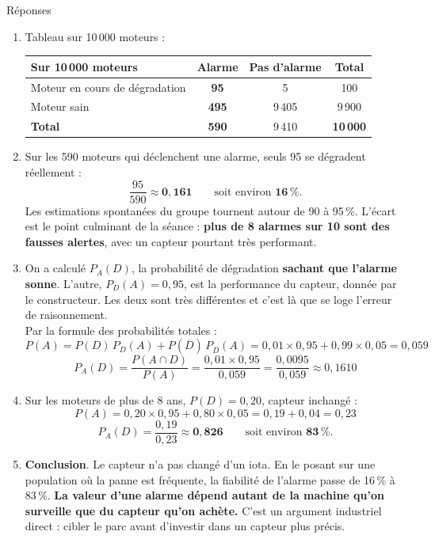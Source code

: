 \documentclass[a4paper,11pt]{article}
\begin{document}
\begin{exo}{Réponses}
\begin{enumerate}
  \item Tableau sur 10\,000 moteurs :
  \begin{center}
  \renewcommand{\arraystretch}{1.5}
  \begin{tabular}{|>{\columncolor{uimmlightblue}}l|c|c|c|}
  \hline
  \rowcolor{uimmlightblue}
  \textbf{Sur 10\,000 moteurs} & \textbf{Alarme} & \textbf{Pas d'alarme} & \textbf{Total} \\
  \hline
  Moteur en cours de dégradation & \textbf{95} & 5 & 100 \\
  \hline
  Moteur sain & \textbf{495} & 9\,405 & 9\,900 \\
  \hline
  \textbf{Total} & \textbf{590} & 9\,410 & \textbf{10\,000} \\
  \hline
  \end{tabular}
  \end{center}
  \item Sur les 590 moteurs qui déclenchent une alarme, seuls 95 se dégradent réellement :
  \[ \frac{95}{590} \approx \mathbf{0{,}161} \qquad \text{soit environ } \mathbf{16\,\%}. \]
  Les estimations spontanées du groupe tournent autour de 90 à 95\,\%. L'écart est le point culminant de la séance : \textbf{plus de 8 alarmes sur 10 sont des fausses alertes}, avec un capteur pourtant très performant.
  \item On a calculé $P_A(D)$, la probabilité de dégradation \textbf{sachant que l'alarme sonne}. L'autre, $P_D(A) = 0{,}95$, est la performance du capteur, donnée par le constructeur. Les deux sont très différentes et c'est là que se loge l'erreur de raisonnement. \\[4pt]
  Par la formule des probabilités totales :
  \[ P(A) = P(D)\,P_D(A) + P(\overline{D})\,P_{\overline{D}}(A) = 0{,}01 \times 0{,}95 + 0{,}99 \times 0{,}05 = 0{,}059 \]
  \[ P_A(D) = \frac{P(A \cap D)}{P(A)} = \frac{0{,}01 \times 0{,}95}{0{,}059} = \frac{0{,}0095}{0{,}059} \approx 0{,}1610 \]
  \item Sur les moteurs de plus de 8 ans, $P(D) = 0{,}20$, capteur inchangé :
  \[ P(A) = 0{,}20 \times 0{,}95 + 0{,}80 \times 0{,}05 = 0{,}19 + 0{,}04 = 0{,}23 \]
  \[ P_A(D) = \frac{0{,}19}{0{,}23} \approx \mathbf{0{,}826} \qquad \text{soit environ } \mathbf{83\,\%}. \]
  \item \textbf{Conclusion}. Le capteur n'a pas changé d'un iota. En le posant sur une population où la panne est fréquente, la fiabilité de l'alarme passe de 16\,\% à 83\,\%. \textbf{La valeur d'une alarme dépend autant de la machine qu'on surveille que du capteur qu'on achète.} C'est un argument industriel direct : cibler le parc avant d'investir dans un capteur plus précis.
\end{enumerate}
\end{exo}
\end{document}
